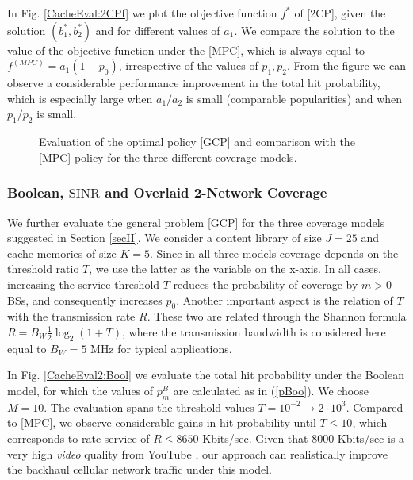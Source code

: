 \documentclass[conference,twocolum,final]{IEEEtran}
\begin{document}
In Fig. \ref{CacheEval:2CPf} we plot the objective function $f^*$ of [2CP], given the solution $(b_1^*,b_2^*)$ and for different values of $a_1$. We compare the solution to the value of the objective function under the [MPC], which is always equal to $f^{(MPC)}=a_1(1-p_0)$, irrespective of the values of $p_1,p_2$. From the figure we can observe a considerable performance improvement in the total hit probability, which is especially large when $a_1/a_2$ is small (comparable popularities) and when $p_1/p_2$ is small. 



\begin{figure*}[th!]    
\centering  
\label{CacheEval2}        
\caption{Evaluation of the optimal policy [GCP] and comparison with the [MPC] policy for the three different coverage models.}
\end{figure*}


\subsubsection{Boolean, $\mathrm{SINR}$ and Overlaid 2-Network Coverage}

We further evaluate the general problem [GCP] for the three coverage models suggested in Section \ref{secII}. We consider a content library of size $J=25$ and cache memories of size $K=5$. Since in all three models coverage depends on the threshold ratio $T$, we use the latter as the variable on the x-axis. In all cases, increasing the service threshold $T$ reduces the probability of coverage by $m>0$ BSs, and consequently increases $p_0$. Another important aspect is the relation of $T$ with the transmission rate $R$. These two are related through the Shannon formula 
$R = B_W\frac{1}{2}\log_2\left(1+T\right)$,
where the transmission bandwidth is considered here equal to $B_W=5$ MHz for typical applications.

In Fig. \ref{CacheEval2:Bool} we evaluate the total hit probability under the Boolean model, for which the values of $p_m^B$ are calculated as in (\ref{pBoo}). We choose $M=10$. The evaluation spans the threshold values $T=10^{-2}\rightarrow 2\cdot 10^3$. Compared to [MPC], we observe considerable gains in hit probability until $T\leq 10$, which corresponds to rate service of $R\leq 8650$ Kbits/sec. Given that $8000$ Kbits/sec is a very high \textit{video} quality from YouTube \cite{YouTubeEncode}, our approach can realistically improve the backhaul cellular network  traffic under this model.
\end{document}
